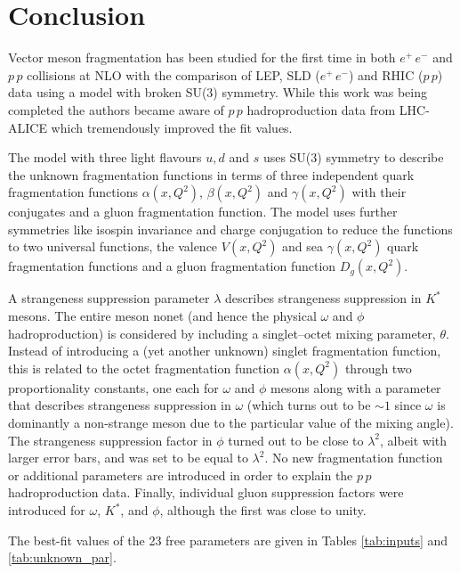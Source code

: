 \documentclass{ws-ijmpa}
\begin{document}
\section{Conclusion}
\label{Sum}
Vector meson fragmentation has been studied for the first time in both
$e^+\,e^-$ and $p\,p$ collisions at NLO with the comparison of LEP,
SLD ($e^+\,e^-$) and RHIC ($p\,p$) data using a model with broken SU(3)
symmetry. While this work was being completed the authors became aware
of $p\,p$ hadroproduction data from LHC-ALICE which tremendously
improved the fit values.

The model with three light flavours $u, d$ and $s$ uses SU(3) symmetry
to describe the unknown fragmentation functions in terms of three
independent quark fragmentation functions $\alpha(x, Q^2)$, $\beta(x,
Q^2)$ and $\gamma(x, Q^2)$ with their conjugates and a gluon fragmentation
function. The model uses further symmetries like isospin invariance and
charge conjugation to reduce the functions to two universal functions,
the valence $V(x, Q^2)$ and sea $\gamma(x, Q^2)$ quark fragmentation
functions and a gluon fragmentation function $D_g(x, Q^2)$.

A strangeness suppression parameter $\lambda$ describes strangeness
suppression in $K^*$ mesons. The entire meson nonet (and hence the
physical $\omega$ and $\phi$ hadroproduction) is considered by including
a singlet--octet mixing parameter, $\theta$. Instead of introducing a (yet
another unknown) singlet fragmentation function, this is related to the
octet fragmentation function $\alpha(x, Q^2)$ through two
proportionality constants, one each for $\omega$ and $\phi$ mesons along
with a parameter that describes strangeness suppression in $\omega$
(which turns out to be $\sim 1$ since $\omega$ is dominantly a
non-strange meson due to the particular value of the mixing angle). The
strangeness suppression factor in $\phi$ turned out to be close to
$\lambda^2$, albeit with larger error bars, and was set to be equal to
$\lambda^2$. No new fragmentation function or additional parameters are
introduced in order to explain the $p\,p$ hadroproduction data. Finally,
individual gluon suppression factors were introduced for $\omega$,
$K^*$, and $\phi$, although the first was close to unity.

The best-fit values of the 23 free parameters are given in Tables
\ref{tab:inputs} and \ref{tab:unknown_par}.
\end{document}
